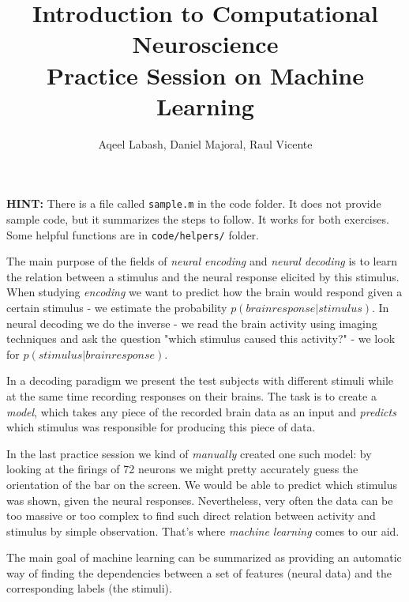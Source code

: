 \documentclass[a4paper,11pt]{article}
\author{\large{Aqeel Labash, Daniel Majoral, Raul Vicente}}
\title{\huge{Introduction to Computational Neuroscience}\\\LARGE{Practice Session on Machine Learning}}
\begin{document}
\maketitle

\textbf{HINT: } There is a file called \texttt{sample.m} in the code folder. It does not provide sample code, but it summarizes the steps to follow. It works for both exercises. Some helpful functions are in \texttt{code/helpers/} folder.

\vspace{0.8cm}
%
%
The main purpose of the fields of \emph{neural encoding} and \emph{neural decoding} is to learn the relation between a stimulus and the neural response elicited by this stimulus. When studying \emph{encoding} we want to predict how the brain would respond given a certain stimulus - we estimate the probability $p(brain response | stimulus)$. In neural decoding we do the inverse - we read the brain activity using imaging techniques and ask the question "which stimulus caused this activity?" - we look for $p(stimulus | brain response)$. 

In a decoding paradigm we present the test subjects with different stimuli while at the same time recording responses on their brains. The task is to create a \emph{model}, which takes any piece of the recorded brain data as an input and \emph{predicts} which stimulus was responsible for producing this piece of data.

In the last practice session we kind of \emph{manually} created one such model: by looking at the firings of 72 neurons we might pretty accurately guess the orientation of the bar on the screen. We would be able to predict which stimulus was shown, given the neural responses. Nevertheless, very often the data can be too massive or too complex to find such direct relation between activity and stimulus by simple observation. That's where \emph{machine learning} comes to our aid.

The main goal of machine learning can be summarized as providing an automatic way of finding the dependencies between a set of features (neural data) and the corresponding labels (the stimuli).\\
\end{document}
